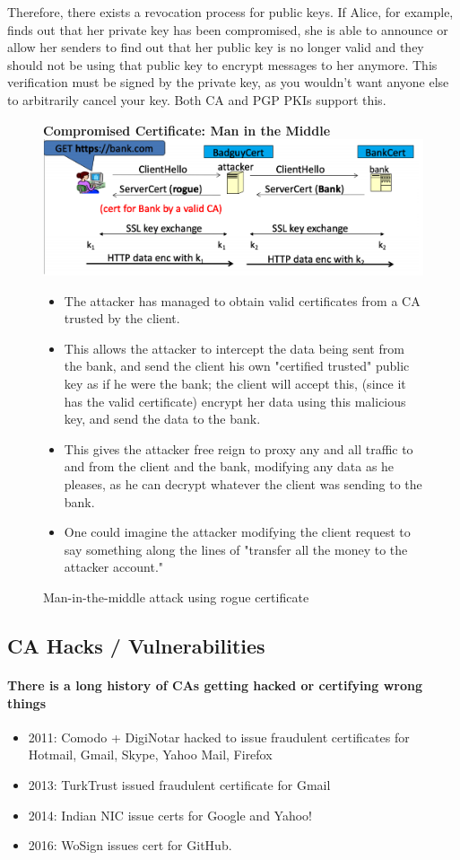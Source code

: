 \documentclass[11pt]{article} %
\begin{document}
\bigskip
Therefore, there exists a revocation process for public keys. If Alice, for example, finds out that her private key has been compromised, she is able to announce or allow her senders to find out that her public key is no longer valid and they should not be using that public key to encrypt messages to her anymore. This verification must be signed by the private key, as you wouldn't want anyone else to arbitrarily cancel your key. Both CA and PGP PKIs support this. 
\newpage
\begin{figure}
    \centering
    \textbf{Compromised Certificate: Man in the Middle}
    \includegraphics[scale=.4]{./cert3.png}
    \caption{Man-in-the-middle attack using rogue certificate}
    \begin{itemize}
      \item The attacker has managed to obtain valid certificates from a CA trusted by the client.
      \item This allows the attacker to intercept the data being sent from the bank, and send the client his own "certified trusted" public key as if he were the bank; the client will accept this, (since it has the valid certificate) encrypt her data using this malicious key, and send the data to the bank.
      \item This gives the attacker free reign to proxy any and all traffic to and from the client and the bank, modifying any data as he pleases, as he can decrypt whatever the client was sending to the bank.
      \item One could imagine the attacker modifying the client request to say something along the lines of "transfer all the money to the attacker account." 
    \end{itemize}
\end{figure}

\subsection {CA Hacks / Vulnerabilities}
\paragraph{There is a long history of CAs getting hacked or certifying wrong things}
 \begin{itemize}
    \item 2011: Comodo + DigiNotar hacked to issue fraudulent certificates for Hotmail, Gmail, Skype, Yahoo Mail, Firefox
    \item 2013: TurkTrust issued fraudulent certificate for Gmail
    \item 2014: Indian NIC issue certs for Google and Yahoo!
    \item 2016: WoSign issues cert for GitHub.
\end{itemize}
\end{document}

